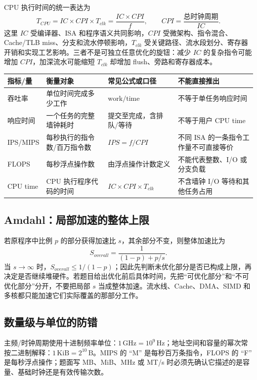 \documentclass[UTF8,fontset=fandol,11pt,a4paper]{ctexart}
\begin{document}
CPU 执行时间的统一表达为
\[
T_{CPU}=IC\times CPI\times T_{clk}
       =\frac{IC\times CPI}{f},
\qquad
CPI=\frac{\text{总时钟周期}}{IC}.
\]
这里 $IC$ 受编译器、ISA 和程序语义共同影响，$CPI$ 受微架构、指令混合、Cache/TLB miss、分支和流水停顿影响，$T_{clk}$ 受关键路径、流水段划分、寄存器开销和实现工艺影响。三者不是可独立任意优化的旋钮：减少 $IC$ 的复杂指令可能增加 $CPI$，加深流水可能缩短 $T_{clk}$ 却增加 flush、旁路和寄存器成本。

\begin{center}\small
\begin{tabularx}{\linewidth}{L{2.4cm}L{3.0cm}L{3.1cm}Y}
\toprule
指标/量 & 衡量对象 & 常见公式或口径 & 不能直接推出\\\midrule
吞吐率 & 单位时间完成多少工作 & $\text{work}/\text{time}$ & 不等于单任务响应时间\\
响应时间 & 一个任务的完整墙钟耗时 & 提交至完成，含排队/等待 & 不等于用户 CPU time\\
IPS/MIPS & 每秒执行的指令数/百万指令数 & $IPS=f/CPI$ & 不同 ISA 的一条指令工作量不可直接等价\\
FLOPS & 每秒浮点操作数 & 由浮点操作计数定义 & 不能代表整数、I/O 或分支负载\\
CPU time & CPU 执行程序代码的时间 & $IC\times CPI\times T_{clk}$ & 不含墙钟 I/O 等待和其他任务占用\\
\bottomrule
\end{tabularx}
\end{center}

\subsection{Amdahl：局部加速的整体上限}
若原程序中比例 $p$ 的部分获得加速比 $s$，其余部分不变，则整体加速比为
\[
S_{overall}=\frac{1}{(1-p)+p/s}.
\]
当 $s\to\infty$ 时，$S_{overall}\le 1/(1-p)$；因此先判断未优化部分是否已构成上限，再决定是否继续堆硬件。若题目给出优化前后具体时间，先把“可优化部分”和“不可优化部分”分开，不要把局部 $s$ 当成整体加速。流水线、Cache、DMA、SIMD 和多核都只能加速它们实际覆盖的那部分工作。

\subsection{数量级与单位的防错}
主频/时钟周期使用十进制频率单位：$1\,\mathrm{GHz}=10^9\,\mathrm{Hz}$；地址空间和容量的幂次常按二进制解释：$1\,\mathrm{KiB}=2^{10}\,\mathrm{B}$。MIPS 的 “M” 是每秒百万条指令，FLOPS 的 “F” 是每秒浮点操作；题面写 MB、MiB、MHz 或 MT/s 时必须先确认它描述的是容量、基础时钟还是有效传输次数。
\end{document}
